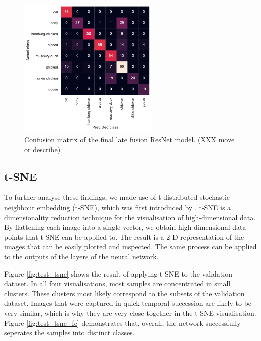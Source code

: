 \documentclass{l4proj}
\begin{document}
\begin{figure}[ht]
  \centering
  \includegraphics[width=0.6\textwidth]{images/evaluation/confusion/final}
  \caption{Confusion matrix of the final late fusion ResNet model. (XXX move or describe)}
  \label{fig:confusion}
\end{figure}


\subsection{t-SNE}
\label{tsne}

To further analyse these findings, we made use of t-distributed stochastic neighbour embedding (t-SNE), which was first introduced by \citet{maaten_visualizing_2008}. t-SNE is a dimensionality reduction technique for the visualisation of high-dimensional data. By flattening each image into a single vector, we obtain high-dimensional data points that t-SNE can be applied to. The result is a 2-D representation of the images that can be easily plotted and inspected. The same process can be applied to the outputs of the layers of the neural network.

Figure \ref{fig:test_tsne} shows the result of applying t-SNE to the validation dataset. In all four visualisations, most samples are concentrated in small clusters. These clusters most likely correspond to the subsets of the validation dataset. Images that were captured in quick temporal succession are likely to be very similar, which is why they are very close together in the t-SNE visualisation. Figure \ref{fig:test_tsne_fc} demonstrates that, overall, the network successfully seperates the samples into distinct classes.
\end{document}

